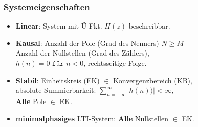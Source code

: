 \begin{multicols*}{2}
\subsubsection{Systemeigenschaften}
\begin{itemize}
	\item \textbf{Linear}: System mit Ü-Fkt. $\underline{H}(z)$ beschreibbar.
	\item \textbf{Kausal}:
	      Anzahl der Pole (Grad des Nenners)  $N\ge M$\\
	      Anzahl der Nullstellen (Grad des Zählers),\\
	      $ h(n) = 0 \texttt{ für } n<0 $, rechtsseitige Folge.
	\item \textbf{Stabil}:
	      Einheitskreis (EK) $\in$ Konvergenzbereich (KB),\\
	   absolute Summierbarkeit: $ \sum_{n=-\infty}^{\infty}|h(n))| < \infty $,\\
	   \textbf{Alle} Pole $\in$ EK.
	\item \textbf{minimalphasiges} LTI-System: \textbf{Alle} Nullstellen $\in$ EK.
\end{itemize}



\end{multicols*}
